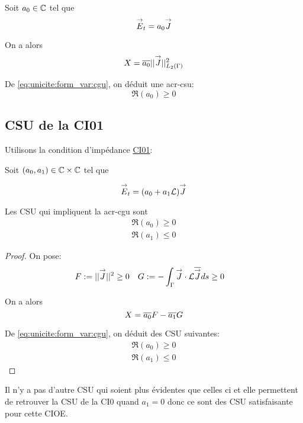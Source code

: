     Soit \(a_0 \in \mathbb C\) tel que
    \[
      {\overset{\rightarrow}{E}}_t = a_0 {\overset{\rightarrow}{J}}
    \]

    On a alors
    \begin{equation*}
    X = {\overline{a_0}}||{\overset{\rightarrow}{J}}||_{L_2(\Gamma)}^2
    \end{equation*}

    De \eqref{eq:unicite:form_var:cgu}, on déduit une \gls{acr-csu}:
    \begin{equation}
    \Re\left(a_0\right) \ge 0
    \end{equation}

  \subsection{CSU de la CI01}
    Utilisons la condition d’impédance \hyperlink{ci01}{CI01}:

    Soit \((a_0, a_1) \in \mathbb C\times\mathbb C\) tel que

    \[
      {\overset{\rightarrow}{E}}_t = (a_0 +a_1 \mathcal{L}){\overset{\rightarrow}{J}}
    \]


    \begin{prop}
      Les CSU qui impliquent la \gls{acr-cgu} sont
      \begin{align}
        \Re\left(a_0\right) \ge 0\\
        \Re\left(a_1\right) \le 0
      \end{align}
    \end{prop}

    \begin{proof}
      On pose:
      \begin{align*}
        F&:= || {\overset{\rightarrow}{J}}|| ^2 \ge 0  & G&:= -\int_\Gamma {\overset{\rightarrow}{J}}\cdot \mathcal{L}{\overline{{\overset{\rightarrow}{J}}}} ds \ge 0
      \end{align*}

      On a alors
      \begin{equation*}
        X = {\overline{a_0}}F - {\overline{a_1}}G
      \end{equation*}

      De \eqref{eq:unicite:form_var:cgu}, on déduit des CSU suivantes:
      \begin{align}
        \Re\left(a_0\right) \ge 0\\
        \Re\left(a_1\right) \le 0
      \end{align}
    \end{proof}

    Il n'y a pas d'autre CSU qui soient plus évidentes que celles ci et elle permettent de retrouver la CSU de la CI0 quand \(a_1=0\) donc ce sont des CSU satisfaisante pour cette CIOE.

